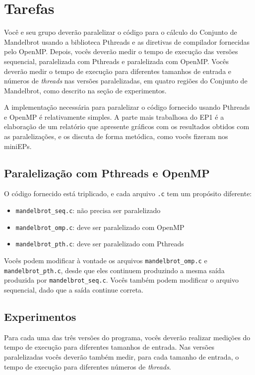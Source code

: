 \documentclass[final,12pt,a4paper]{elsarticle}
\begin{document}
\section{Tarefas}

Você e seu grupo deverão paralelizar o código para o cálculo do Conjunto de
Mandelbrot usando a biblioteca Pthreads e as diretivas de compilador fornecidas
pelo OpenMP. Depois, vocês deverão medir o tempo de execução das versões
sequencial, paralelizada com Pthreads e paralelizada com OpenMP. Vocês deverão
medir o tempo de execução para diferentes tamanhos de entrada e números de
\textit{threads} nas versões paralelizadas, em quatro regiões do Conjunto
de Mandelbrot, como descrito na seção de experimentos.

A implementação necessária para paralelizar o código fornecido usando Pthreads e
OpenMP é relativamente simples. A parte mais trabalhosa do EP1 é a elaboração de
um relatório que apresente gráficos com os resultados obtidos com as paralelizações, 
e os discuta de forma metódica, como vocês fizeram nos miniEPs.

\subsection{Paralelização com Pthreads e OpenMP}

O código fornecido está triplicado, e cada arquivo \texttt{.c}
tem um propósito diferente:

\begin{itemize}
    \item \texttt{mandelbrot\_seq.c}: não precisa ser paralelizado
    \item \texttt{mandelbrot\_omp.c}: deve ser paralelizado com OpenMP
    \item \texttt{mandelbrot\_pth.c}: deve ser paralelizado com Pthreads
\end{itemize}

Vocês  podem  modificar  à  vontade  os  arquivos  \texttt{mandelbrot\_omp.c}  e
\texttt{mandelbrot\_pth.c}, desde  que eles  continuem produzindo a  mesma saída
produzida por \texttt{mandelbrot\_seq.c}. Vocês também podem modificar o arquivo
sequencial, dado que a saída continue correta.

\subsection{Experimentos}

Para cada uma das três versões do programa, vocês  deverão realizar medições do
tempo de execução para diferentes tamanhos de entrada. Nas versões paralelizadas
vocês deverão  também medir, para cada  tamanho de entrada, o tempo de execução
para diferentes números de \textit{threads}.
\end{document}
